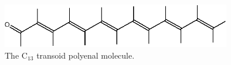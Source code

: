 \begin{center}
\begin{figure}[ht]
\begin{center}
\includegraphics[width=10cm]{02_localization/images/C13-molecule.eps}
\end{center}
\caption{\footnotesize The C$_{13}$ transoid polyenal molecule. }
\label{fig:C13-molecule}
\end{figure}
\end{center}
